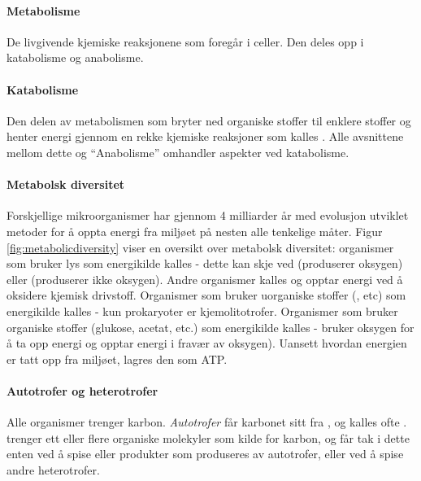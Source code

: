 \paragraph{Metabolisme} De livgivende kjemiske reaksjonene som foregår i celler. Den deles opp i katabolisme og anabolisme.

\paragraph{Katabolisme} Den delen av metabolismen som bryter ned organiske stoffer til enklere stoffer og henter energi gjennom en rekke kjemiske reaksjoner som kalles . Alle avsnittene mellom dette og ``Anabolisme'' omhandler aspekter ved katabolisme.

\paragraph{Metabolsk diversitet} Forskjellige mikroorganismer har gjennom 4 milliarder år med evolusjon utviklet metoder for å oppta energi fra miljøet på nesten alle tenkelige måter. Figur \ref{fig:metabolicdiversity} viser en oversikt over metabolsk diversitet: organismer som bruker lys som energikilde kalles  - dette kan skje ved  (produserer oksygen) eller  (produserer ikke oksygen). Andre organismer kalles  og opptar energi ved å oksidere kjemisk drivstoff. Organismer som bruker uorganiske stoffer (, etc) som energikilde kalles  - kun prokaryoter er kjemolitotrofer. Organismer som bruker organiske stoffer (glukose, acetat, etc.) som energikilde kalles  -  bruker oksygen for å ta opp energi og  opptar energi i fravær av oksygen). Uansett hvordan energien er tatt opp fra miljøet, lagres den som ATP. 

\paragraph{Autotrofer og heterotrofer} Alle organismer trenger karbon. \emph{Autotrofer} får karbonet sitt fra , og kalles ofte .  trenger ett eller flere organiske molekyler som kilde for karbon, og får tak i dette enten ved å spise  eller produkter som produseres av autotrofer, eller ved å spise andre heterotrofer.

